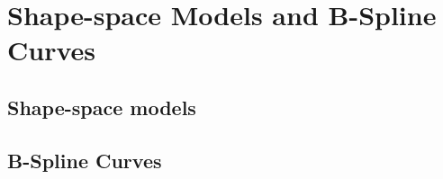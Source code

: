 \chapter{Shape-space Models and B-Spline Curves}
\label{chapter:bspline}

\section{Shape-space models}
\label{sec:ssm}

\section{B-Spline Curves}
\label{sec:bsc}


